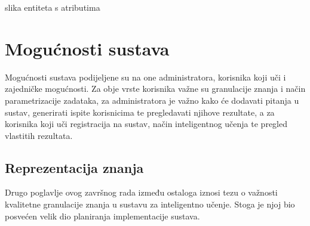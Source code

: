 \documentclass[times, utf8, zavrsni]{fer}
\begin{document}
\pagebreak

slika entiteta s atributima

\pagebreak
\section{Mogućnosti sustava}
Mogućnosti sustava podijeljene su na one administratora, korisnika koji uči i zajedničke mogućnosti. Za obje vrste korisnika važne su granulacije znanja i način parametrizacije zadataka, za administratora je važno kako će dodavati pitanja u sustav, generirati ispite korisnicima te pregledavati njihove rezultate, a za korisnika koji uči registracija na sustav, način inteligentnog učenja te pregled vlastitih rezultata.

\subsection{Reprezentacija znanja}
Drugo poglavlje ovog završnog rada između ostaloga iznosi tezu o važnosti kvalitetne granulacije znanja u sustavu za inteligentno učenje. Stoga je njoj bio posvećen velik dio planiranja implementacije sustava. 
\end{document}
